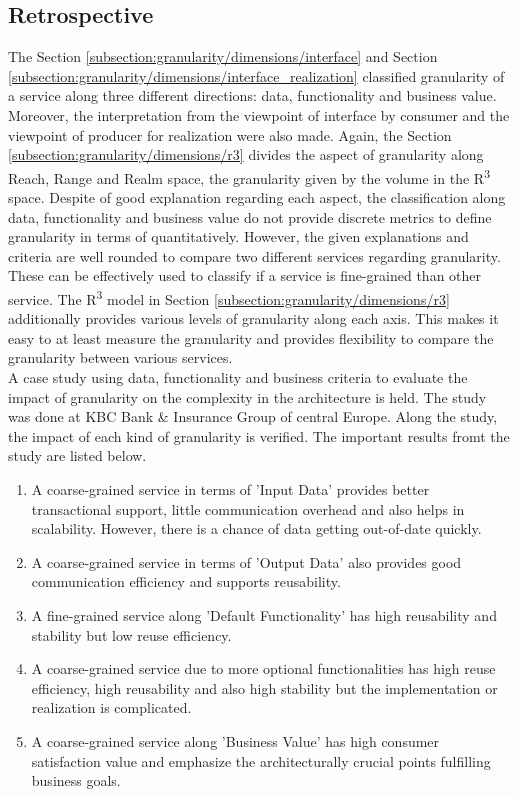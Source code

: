 \subsection{Retrospective}\label{subsection:granularity/dimensions/retrospective}
The Section \ref{subsection:granularity/dimensions/interface} and Section \ref{subsection:granularity/dimensions/interface_realization} classified granularity of a service along three different directions: data, functionality and business value. Moreover, the interpretation from the viewpoint of interface by consumer and the viewpoint of producer for realization were also made.
Again, the Section \ref{subsection:granularity/dimensions/r3} divides the aspect of granularity along Reach, Range and Realm space, the granularity given by the volume in the R\textsuperscript{3} space.
Despite of good explanation regarding each aspect, the classification along data, functionality and business value do not provide discrete metrics to define granularity in terms of quantitatively. However, the given explanations and criteria are well rounded to compare two different services regarding granularity. These can be effectively used to classify if a service is fine-grained than other service.
The R\textsuperscript{3} model in Section \ref{subsection:granularity/dimensions/r3} additionally provides various levels of granularity along each axis. This makes it easy to at least measure the granularity and provides flexibility to compare the granularity between various services.
\\
A case study \cite{Pierre-Reldin:2007aa} using data, functionality and business criteria to evaluate the impact of granularity on the complexity in the architecture is held. The study was done at KBC Bank & Insurance Group of central Europe. Along the study, the impact of each kind of granularity is verified. The important results fromt the study are listed below.

\begin{enumerate}
\item A coarse-grained service in terms of 'Input Data' provides better transactional support, little communication overhead and also helps in scalability. However, there is a chance of data getting out-of-date quickly.
\item A coarse-grained service in terms of 'Output Data' also provides good communication efficiency and supports reusability.
\item A fine-grained service along 'Default Functionality' has high reusability and stability but low reuse efficiency.
\item A coarse-grained service due to more optional functionalities has high reuse efficiency, high reusability and also high stability but the implementation or realization is complicated.
\item A coarse-grained service along 'Business Value' has high consumer satisfaction value and emphasize the architecturally crucial points fulfilling business goals.
\end{enumerate}

